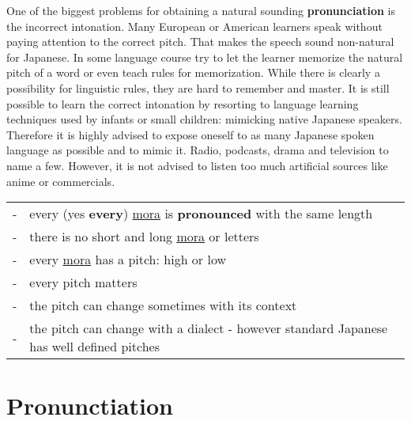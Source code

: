 One of the biggest
problems for obtaining a natural sounding \textbf{pronunciation} is the
incorrect intonation. Many European or American learners speak without paying
attention to the correct pitch. That makes the speech sound non-natural for
Japanese. In some language course try to let the learner memorize the natural
pitch of a word or even teach rules for memorization. While there is clearly a
possibility for linguistic rules, they are hard to remember and master. It is
still possible to learn the correct intonation by resorting to language
learning techniques used by infants or small children: mimicking native
Japanese speakers. Therefore it is highly advised to expose oneself to as many
Japanese spoken language as possible and to mimic it. Radio, podcasts, drama
and television to name a few. However, it is not advised to listen too much
artificial sources like anime or commercials.

\bigskip
\begin{tabular}{rl}
-&every (yes \textbf{every}) \hyperref[sec:Mora]{mora} is \textbf{pronounced}
  with the same length\\
-&there is no short and long \hyperref[sec:Mora]{mora} or letters\\
-&every \hyperref[sec:Mora]{mora} has a pitch: high or low\\
-&every pitch matters\\
-&the pitch can change  sometimes with its context\\
-&the pitch can change with a dialect - however standard Japanese has well
  defined pitches\\
\end{tabular}

\bigskip

\section{Pronunctiation}







